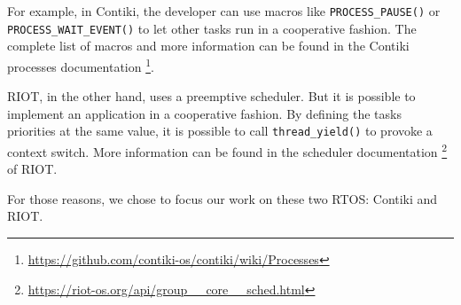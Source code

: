 For example, in Contiki, the developer can use macros like \texttt{PROCESS\_PAUSE()} or \texttt{PROCESS\_WAIT\_EVENT()} to let other tasks run in a cooperative fashion.
The complete list of macros and more information can be found in the Contiki processes documentation \cite{contiki-processes} \footnote{\url{https://github.com/contiki-os/contiki/wiki/Processes}}.

RIOT, in the other hand, uses a preemptive scheduler.
But it is possible to implement an application in a cooperative fashion.
By defining the tasks priorities at the same value, it is possible to call \texttt{thread\_yield()} to provoke a context switch.
More information can be found in the scheduler documentation \cite{riot-scheduler} \footnote{\url{https://riot-os.org/api/group__core__sched.html}} of RIOT.

For those reasons, we chose to focus our work on these two RTOS: Contiki and RIOT.